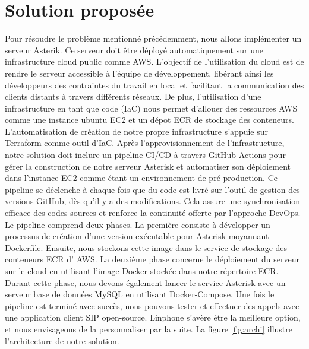 \section[Solution proposée]{Solution proposée}
Pour résoudre le problème mentionné précédemment, nous allons implémenter un serveur Asterik. Ce serveur doit être déployé automatiquement sur une infrastructure cloud public comme AWS. L'objectif de l'utilisation du cloud est de rendre le serveur accessible à l'équipe de développement, libérant ainsi les développeurs des contraintes du travail en local et facilitant la communication des clients distants à travers différents réseaux.
De plus, l'utilisation d'une infrastructure en tant que code (IaC) nous permet d'allouer des ressources AWS comme une instance ubuntu EC2 et un dépot ECR de stockage des conteneurs. L'automatisation de création de notre propre infrastructure s'appuie sur Terraform comme outil d'IaC.  Après l'approvisionnement de l'infrastructure, notre solution doit inclure un pipeline CI/CD à travers GitHub Actions pour gérer la construction de notre serveur Asterisk et automatiser son déploiement dans l'instance EC2 comme étant un environnement de pré-production. Ce pipeline se déclenche à chaque fois que du code est livré sur l'outil de gestion des versions GitHub, dès qu'il y a des modifications. Cela assure une synchronisation efficace des codes sources et renforce la continuité offerte par l'approche DevOps. Le pipeline comprend deux phases. La première consiste à développer un processus de création d'une version exécutable pour Asterisk moyannant Dockerfile. Ensuite, nous stockons cette image dans le service de stockage des conteneurs ECR d’ AWS. La deuxième phase concerne le déploiement du serveur sur le cloud en utilisant l'image Docker stockée dans notre répertoire ECR. Durant cette phase, nous devons également lancer le service Asterisk avec un serveur base de données MySQL en utilisant Docker-Compose.
Une fois le pipeline est terminé avec succès, nous pouvons tester et effectuer des appels avec une application client SIP open-source. Linphone s'avère être la meilleure option, et nous envisageons de la personnaliser par la suite.
La figure \ref{fig:archi} illustre l'architecture de notre solution.

